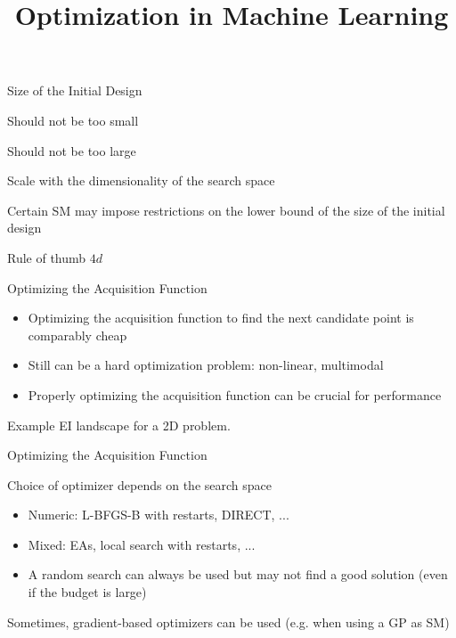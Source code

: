 \documentclass[11pt,compress,t,notes=noshow, xcolor=table]{beamer}
\title{Optimization in Machine Learning}
\begin{document}

\begin{framei}{Size of the Initial Design}
\item Should not be too small
\item Should not be too large
\item Scale with the dimensionality of the search space
\item Certain SM may impose restrictions on the lower bound of the size of the initial design
\item Rule of thumb $4d$
\end{framei}


\begin{framev}{Optimizing the Acquisition Function}
\begin{itemize}
\item Optimizing the acquisition function to find the next candidate point is comparably cheap
\item Still can be a hard optimization problem: non-linear, multimodal
\item Properly optimizing the acquisition function can be crucial for performance
\end{itemize}
\begin{footnotesize}\begin{center} Example EI landscape for a 2D problem.
\end{center}\end{footnotesize}
\end{framev}


\begin{framei}{Optimizing the Acquisition Function}
\item Choice of optimizer depends on the search space
\begin{itemize}
\item Numeric: L-BFGS-B with restarts, DIRECT, ...
\item Mixed: EAs, local search with restarts, ...
\item A random search can always be used but may not find a good solution (even if the budget is large)
\end{itemize}
\item Sometimes, gradient-based optimizers can be used (e.g. when using a GP as SM)
\end{framei}
\end{document}
